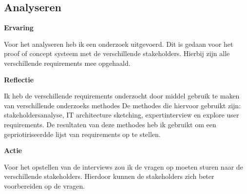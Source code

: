 \subsection{Analyseren}

\textbf{Ervaring}

\whitespace
Voor het analyseren heb ik een onderzoek uitgevoerd.
Dit is gedaan voor het proof of concept systeem met de verschillende stakeholders.
Hierbij zijn alle verschillende requirements mee opgehaald.

\whitespace
\textbf{Reflectie}

\whitespace
Ik heb de verschillende requirements onderzocht door middel gebruik te maken van verschillende onderzoeks methodes
De methodes die hiervoor gebruikt zijn: stakeholdersanalyse, IT architecture sketching, expertinterview en explore user requirements.
De resultaten van deze methodes heb ik gebruikt om een gepriotiriseerdde lijst van requirements op te stellen.

\whitespace
\textbf{Actie}

\whitespace
Voor het opstellen van de interviews zou ik de vragen op moeten sturen naar de verschillende stakeholders.
Hierdoor kunnen de stakeholders zich beter voorbereiden op de vragen.
